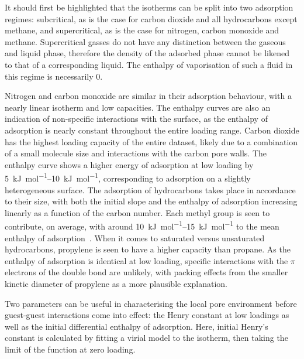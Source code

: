 It should first be highlighted that the isotherms can be split into 
two adsorption regimes: subcritical, as is the case for carbon
dioxide and all hydrocarbons except methane, and supercritical,
as is the case for nitrogen, carbon monoxide and methane.
Supercritical gasses do not have any distinction between the 
gaseous and liquid phase, therefore the density of the adsorbed phase
cannot be likened to that of a corresponding liquid. The enthalpy
of vaporisation of such a fluid in this regime is necessarily 0.

Nitrogen and carbon monoxide are similar in their adsorption behaviour,
with a nearly linear isotherm and low capacities.
The enthalpy curves are also an indication of non-specific 
interactions with the surface, as the enthalpy of adsorption
is nearly constant throughout the entire loading range.
Carbon dioxide has the highest loading capacity of the entire dataset, likely
due to a combination of a small molecule size and interactions with 
the carbon pore walls. The enthalpy curve shows a higher energy of 
adsorption at low loading by \SIrange{5}{10}{\kilo\joule\per\mole}, 
corresponding to adsorption on a slightly heterogeneous surface.
The adsorption of hydrocarbons takes place in accordance to their size, with
both the initial slope and the enthalpy of adsorption increasing linearly
as a function of the carbon number. Each methyl group is seen 
to contribute, on average, with around \SIrange{10}{15}{\kilo\joule\per\mole}
to the mean enthalpy of adsorption~\cite{denayerChromatographicStudyAdsorption1998}.
When it comes to saturated versus unsaturated hydrocarbons, propylene is 
seen to have a higher capacity than propane. As the enthalpy of 
adsorption is identical at low loading, specific interactions with the 
\(\pi\) electrons of the double bond are unlikely, with packing effects 
from the smaller kinetic diameter of propylene as a more plausible
explanation.

Two parameters can be useful in characterising the local pore environment
before guest-guest interactions come into effect: the Henry constant at
low loadings as well as the initial differential enthalpy of adsorption. 
Here, initial Henry's constant is calculated by fitting a virial model to
the isotherm, then taking the limit of the function at zero loading. 

